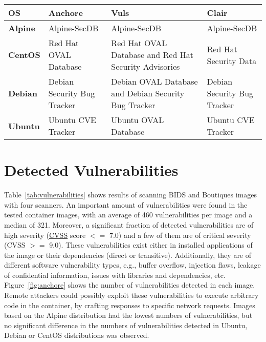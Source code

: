 \begin{center}
\tabulinesep=1.2mm
\begin{tabu} to \textwidth { | X[l] | X[l] | X[l] | X[l] | }
 \hline
\textbf{OS} &   \textbf{Anchore} &      \textbf{Vuls} & \textbf{Clair} \\
\hline
        \textbf{Alpine} & Alpine-SecDB &        Alpine-SecDB &  Alpine-SecDB \\
\hline
        \textbf{CentOS} & Red Hat OVAL Database & Red Hat OVAL Database and Red Hat Security Advisories & Red Hat Security Data \\
\hline
        \textbf{Debian} & Debian Security Bug Tracker & Debian OVAL Database and Debian Security Bug Tracker & Debian Security Bug Tracker \\
\hline
        \textbf{Ubuntu} & Ubuntu CVE Tracker &  Ubuntu OVAL Database &  Ubuntu CVE Tracker \\
 \hline
\end{tabu}
\label{tab:databases}
\end{center}
\addtocounter{table}{-1}
\section{Detected Vulnerabilities}

Table~\ref{tab:vulnerabilities} shows results of scanning BIDS and Boutiques 
images with four scanners. 
An important amount of vulnerabilities were found in the tested container
images, with an average of 460 vulnerabilities
per image and a median of 321.
Moreover, a significant fraction of detected vulnerabilities are
of high severity
(\href{https://www.first.org/cvss/specification-document}{CVSS} score
\(<=\)
7.0) and a few of them are of critical severity (CVSS \(>=\) 9.0).
These vulnerabilities exist either in installed applications
of the image or their dependencies (direct or transitive).
Additionally, they are of different software vulnerability types, e.g.,
buffer overflow, injection flaws, leakage of confidential information,
issues with libraries and dependencies, etc. 
Figure~\ref{fig:anchore} shows the number of vulnerabilities
detected in each image. Remote
attackers could possibly exploit these vulnerabilities to execute
arbitrary code in the container, by crafting responses to specific network
requests. Images based on the Alpine distribution
had the lowest numbers of vulnerabilities, but no significant difference
in the numbers of vulnerabilities detected in
Ubuntu, Debian or CentOS distributions was observed.

